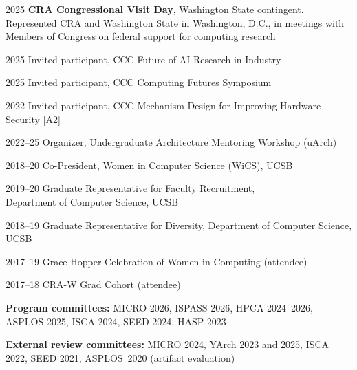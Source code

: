 \documentclass[11pt,letterpaper]{article}
\newcommand{\pref}[1]{\hyperlink{pub:#1}{[#1]}}
\begin{document}
\begin{yearlist}
\item[2025] \textbf{CRA Congressional Visit Day}, Washington State contingent. Represented CRA and Washington State in Washington, D.C., in meetings with Members of Congress on federal support for computing research
\item[2025] Invited participant, CCC Future of AI Research in Industry
\item[2025] Invited participant, CCC Computing Futures Symposium
\item[2022] Invited participant, CCC Mechanism Design for Improving Hardware Security \pref{A2}
\item[2022--25] Organizer, Undergraduate Architecture Mentoring Workshop (uArch)
\item[2018--20] Co-President, Women in Computer Science (WiCS), UCSB
\item[2019--20] Graduate Representative for Faculty Recruitment, \\ Department of Computer Science, UCSB
\item[2018--19] Graduate Representative for Diversity, Department of Computer Science, UCSB
\item[2017--19] Grace Hopper Celebration of Women in Computing (attendee)
\item[2017--18] CRA-W Grad Cohort (attendee)
\end{yearlist}

\textbf{Program committees:} MICRO 2026, ISPASS 2026, HPCA 2024--2026, ASPLOS 2025, ISCA 2024, SEED 2024, HASP 2023

\textbf{External review committees:} MICRO 2024, YArch 2023 and 2025, ISCA 2022, SEED 2021, \mbox{ASPLOS 2020} (artifact evaluation)
\end{document}
